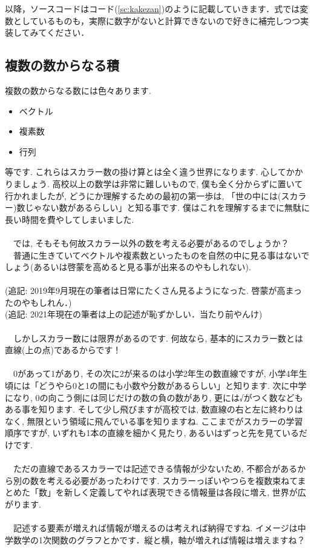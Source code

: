 \documentclass[11pt,a4paper,uplatex]{ujreport}
\begin{document}
以降，ソースコードはコード(\ref{sc:kakezan})のように記載していきます．式では変数としているものも，実際に数字がないと計算できないので好きに補完しつつ実装してみてください．
\subsection{複数の数からなる積}
複数の数からなる数には色々あります.\\
\begin{itemize}
 \item ベクトル
 \item 複素数
 \item 行列
\end{itemize}

等です. これらはスカラー数の掛け算とは全く違う世界になります. 心してかかりましょう. 高校以上の数学は非常に難しいもので, 僕も全く分からずに置いて行かれましたが, どうにか理解するための最初の第一歩は, 「世の中には(スカラー)数じゃない数があるらしい」と知る事です. 僕はこれを理解するまでに無駄に長い時間を費やしてしまいました. \\
\\
　では, そもそも何故スカラー以外の数を考える必要があるのでしょうか？\\
　普通に生きていてベクトルや複素数といったものを自然の中に見る事はないでしょう(あるいは啓蒙を高めると見る事が出来るのやもしれない).\\
\\
(追記: 2019年9月現在の筆者は日常にたくさん見るようになった. 啓蒙が高まったのやもしれん．)\\
(追記: 2021年現在の筆者は上の記述が恥ずかしい．当たり前やんけ)\\
\\
　しかしスカラー数には限界があるのです. 何故なら, 基本的にスカラー数とは直線(上の点)であるからです！ \\
\\
　0があって1があり, その次に2が来るのは小学2年生の数直線ですが, 小学4年生頃には「どうやら0と1の間にも小数や分数があるらしい」と知ります. 次に中学になり, 0の向こう側には同じだけの数の負の数があり, 更には√がつく数などもある事を知ります. そして少し飛びますが高校では, 数直線の右と左に終わりはなく, 無限という領域に飛んでいる事を知りますね. ここまでがスカラーの学習順序ですが, いずれも1本の直線を細かく見たり, あるいはずっと先を見ているだけです. \\
\\
　ただの直線であるスカラーでは記述できる情報が少ないため, 不都合があるから別の数を考える必要があったわけです. スカラーっぽいやつらを複数束ねてまとめた「数」を新しく定義してやれば表現できる情報量は各段に増え, 世界が広がります. \\
\\
　記述する要素が増えれば情報が増えるのは考えれば納得ですね. イメージは中学数学の1次関数のグラフとかです．縦と横，軸が増えれば情報は増えますね？
\\
\end{document}
